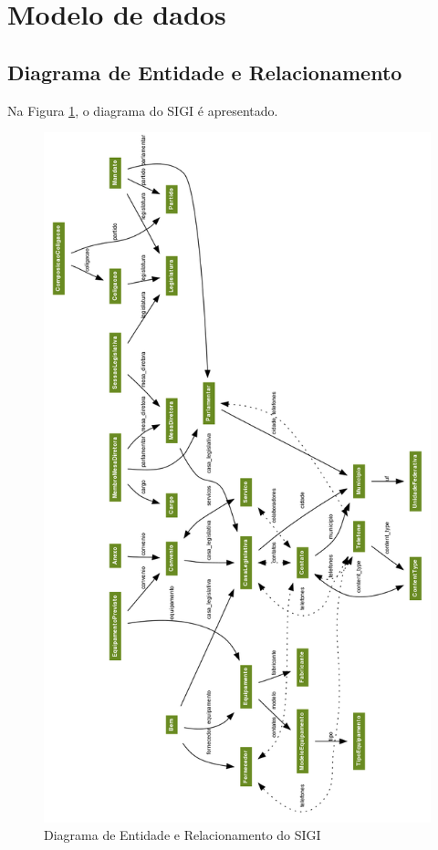 %
%

\section{Modelo de dados}
\label{sec:modelo}

\subsection{Diagrama de Entidade e Relacionamento}
Na Figura \ref{fig:er}, o diagrama do SIGI é apresentado.

\begin{figure}[p]
  \centering
  \includegraphics[width=120mm]{../imagens/er.png}
  \caption{Diagrama de Entidade e Relacionamento do SIGI}
  \label{fig:er}
\end{figure}

